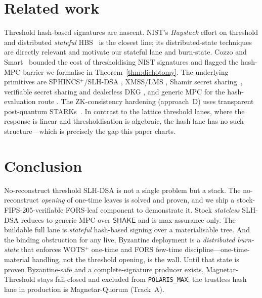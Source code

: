 \documentclass[11pt,a4paper]{article}
\begin{document}
\section{Related work}
\label{sec:related}

Threshold hash-based signatures are nascent. NIST's \emph{Haystack} effort on
threshold and distributed \emph{stateful} HBS~\cite{haystack} is the closest line;
its distributed-state techniques are directly relevant and motivate our stateful
lane and burn-state. Cozzo and Smart~\cite{cozzosmart} bounded the cost of
thresholdising NIST signatures and flagged the hash-MPC barrier we formalise in
Theorem~\ref{thm:dichotomy}. The underlying primitives are SPHINCS$^+$/SLH-DSA
\cite{sphincsplus,fips205}, XMSS/LMS \cite{xmss,sp800208}, Shamir secret
sharing~\cite{shamir}, verifiable secret sharing and dealerless DKG
\cite{feldman,pedersen,gennaro}, and generic MPC for the hash-evaluation route
\cite{gmw,spdz}. The ZK-consistency hardening (approach~D) uses transparent
post-quantum STARKs~\cite{stark}. In contrast to the lattice threshold lanes, where
the response is linear and thresholdisation is algebraic, the hash lane has no such
structure---which is precisely the gap this paper charts.

\section{Conclusion}
\label{sec:conclusion}

No-reconstruct threshold SLH-DSA is not a single problem but a stack. The
no-reconstruct \emph{opening} of one-time leaves is solved and proven, and we ship a
stock-FIPS-205-verifiable FORS-leaf component to demonstrate it. Stock
\emph{stateless} SLH-DSA reduces to generic MPC over $\mathsf{SHAKE}$ and is
max-assurance only. The buildable full lane is \emph{stateful} hash-based signing
over a materialisable tree. And the binding obstruction for any live, Byzantine
deployment is a \emph{distributed burn-state} that enforces WOTS$^+$ one-time and
FORS few-time discipline---one-time-material handling, not the threshold opening, is
the wall. Until that state is proven Byzantine-safe and a complete-signature producer
exists, Magnetar-Threshold stays fail-closed and excluded from \texttt{POLARIS\_MAX};
the trustless hash lane in production is Magnetar-Quorum (Track~A).
\end{document}
